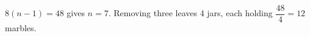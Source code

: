$8(n-1)=48$ gives $n=7$. Removing three leaves 4 jars, each holding $\dfrac{48}{4}=\boxed{12}$ marbles.

